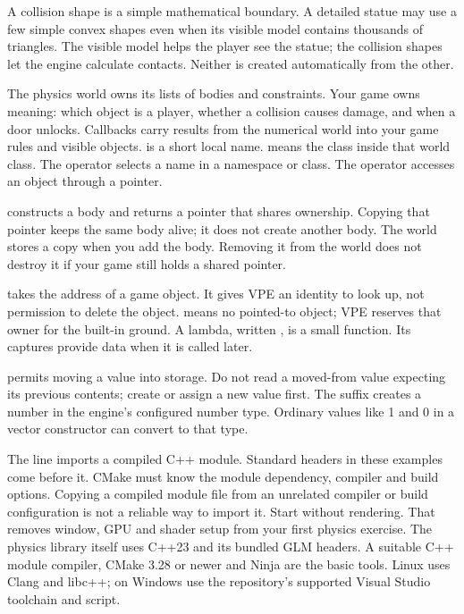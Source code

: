 \documentclass[11pt,a4paper]{article}
\begin{document}
A collision shape is a simple mathematical boundary. A detailed statue may use a few simple convex shapes even when its visible model contains thousands of triangles. The visible model helps the player see the statue; the collision shapes let the engine calculate contacts. Neither is created automatically from the other.

The physics world owns its lists of bodies and constraints. Your game owns meaning: which object is a player, whether a collision causes damage, and when a door unlocks. Callbacks carry results from the numerical world into your game rules and visible objects.
 is a short local name.  means the  class inside that world class. The \api{::} operator selects a name in a namespace or class. The \api{->} operator accesses an object through a pointer.

 constructs a body and returns a pointer that shares ownership. Copying that pointer keeps the same body alive; it does not create another body. The world stores a copy when you add the body. Removing it from the world does not destroy it if your game still holds a shared pointer.

 takes the address of a game object. It gives VPE an identity to look up, not permission to delete the object.  means no pointed-to object; VPE reserves that owner for the built-in ground. A lambda, written , is a small function. Its captures provide data when it is called later.

 permits moving a value into storage. Do not read a moved-from value expecting its previous contents; create or assign a new value first. The  suffix creates a number in the engine's configured number type. Ordinary values like 1 and 0 in a vector constructor can convert to that type.

The line  imports a compiled C++ module. Standard headers in these examples come before it. CMake must know the module dependency, compiler and build options. Copying a compiled module file from an unrelated compiler or build configuration is not a reliable way to import it.
Start without rendering. That removes window, GPU and shader setup from your first physics exercise. The physics library itself uses C++23 and its bundled GLM headers. A suitable C++ module compiler, CMake 3.28 or newer and Ninja are the basic tools. Linux uses Clang and libc++; on Windows use the repository's supported Visual Studio toolchain and script.
\end{document}
